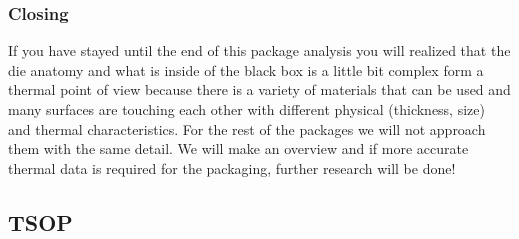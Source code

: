 \documentclass[final]{cubedoc}
\begin{document}
	
	
	\subsubsection{Closing}
	
	
	If you have stayed until the end of this package analysis you will realized that the die anatomy and what is inside of the black box is a little bit complex form a thermal point of view because there is a variety of materials that can be used and many surfaces are touching each other with different physical (thickness, size) and thermal characteristics. For the rest of the packages we will not approach them with the same detail. We will make an overview and if more accurate thermal data is required for the packaging, further research will be done!
	
	
	
	
	
	\subsection{TSOP}
	
	
	
\end{document}

